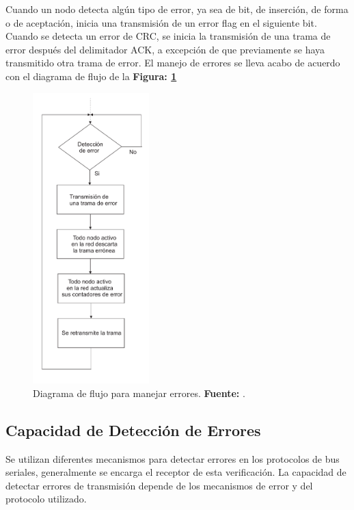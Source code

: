 Cuando un nodo detecta algún tipo de error, ya sea de bit, de inserción, de forma o de aceptación, inicia una transmisión de un error flag en el siguiente bit. Cuando se detecta un error de CRC, se inicia la transmisión de una trama de error después del delimitador ACK, a excepción de que previamente se haya transmitido otra trama de error.
El manejo de errores se lleva acabo de acuerdo con el diagrama de flujo de la \textbf {Figura: \ref{D_F}}
\begin{figure}[H]
	\centering
		\includegraphics[width=0.40\textwidth]{./Cap2imagen/diagrama.pdf}
	\caption[Diagrama de flujo para manejar errores.]{Diagrama de flujo para manejar errores.\textbf{ Fuente:} \cite{DSEEPC}.}
	\label{D_F} %
\end{figure}

\subsection{Capacidad de Detección de Errores}

Se utilizan diferentes mecanismos para detectar errores en los protocolos de bus seriales, generalmente se encarga el receptor de esta verificación. La capacidad de detectar errores de transmisión depende de los mecanismos de error y del protocolo utilizado.




